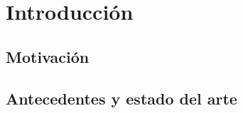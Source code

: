 \chapter{Introducción}

\section[Motivación]{Motivación}
\section[Antecedentes y estado del arte]{Antecedentes y estado del arte}
	
	

